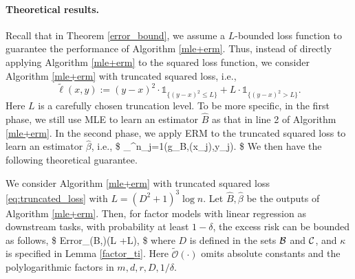 \paragraph{Theoretical results.}
Recall that in Theorem \ref{error_bound}, we assume a $L$-bounded loss function to guarantee the performance of Algorithm \ref{mle+erm}. Thus, instead of directly applying Algorithm \ref{mle+erm} to the squared loss function, we consider Algorithm \ref{mle+erm} with truncated squared loss, i.e.,
\begin{equation}\label{eq:truncated_loss}
\tilde{\ell} (x,y) := (y-x)^{2}\cdot \mathds{1}_{\{(y-x)^2\leq L\}} + L \cdot \mathds{1}_{\{(y-x)^2 > L\}}.
\end{equation}
Here $L$ is a carefully chosen truncation level. To be more specific, in the first phase, we still use MLE to learn an estimator $\hat B$ as that in line 2 of Algorithm \ref{mle+erm}. In the second phase, we apply ERM to the truncated squared loss to learn an estimator $\hat\beta$, i.e.,
\$
\hat\beta\leftarrow\argmin_{\beta\in{}}\sum^n_{j=1}\tilde{\ell}\big(g_{\hat B,\beta}(x_j),y_j\big).
\$
We then have the following theoretical guarantee.
\begin{theorem}\label{factor_main}
We consider Algorithm \ref{mle+erm} with truncated squared loss \eqref{eq:truncated_loss}
with $L=(D^{2}+1)^{3}\log n$. Let $\hat B, \hat\beta$ be the outputs of Algorithm \ref{mle+erm}. Then, for factor models with linear regression as downstream tasks, with probability at least $1-\delta$, the excess risk can be bounded as follows,
\$
{\rm Error}_{\ell}(\hat B,\hat\beta)\leq {}\bigg(\kappa L +L\bigg),
\$
where $D$ is defined in the sets ${\cal B}$ and ${\cal C}$, and $\kappa$ is specified in Lemma \ref{factor_ti}.
Here $\tilde{\mathcal{O}}(\cdot)$ omits absolute constants and the polylogarithmic factors in $m, d, r, D, 1/\delta$.
\end{theorem}

